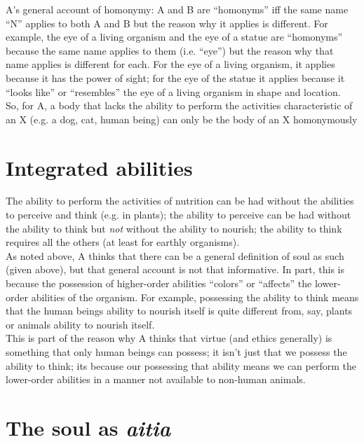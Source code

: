 \documentclass[11pt]{article}
\begin{document}
\noindent A's general account of homonymy: A and B are ``homonyms'' iff the same name ``N'' applies to both A and B but the reason why it applies is different. For example, the eye of a living organism and the eye of a statue are ``homonyms'' because the same name applies to them (i.e. ``eye'') but the reason why that name applies is different for each. For the eye of a living organism, it applies because it has the power of sight; for the eye of the statue it applies because it ``looks like'' or ``resembles'' the eye of a living organism in shape and location.\\

\noindent So, for A, a body that lacks the ability to perform the activities characteristic of an X (e.g. a dog, cat, human being) can only be the body of an X homonymously

\section*{Integrated abilities}

\noindent The ability to perform the activities of nutrition can be had without the abilities to perceive and think (e.g. in plants); the ability to perceive can be had without the ability to think but \emph{not} without the ability to nourish; the ability to think requires all the others (at least for earthly organisms).\\

\noindent As noted above, A thinks that there can be a general definition of soul as such (given above), but that general account is not that informative. In part, this is because the possession of higher-order abilities ``colors'' or ``affects'' the lower-order abilities of the organism. For example, possessing the ability to think means that the human beings ability to nourish itself is quite different from, say, plants or animals ability to nourish itself.\\

\noindent This is part of the reason why A thinks that virtue (and ethics generally) is something that only human beings can possess; it isn't just that we possess the ability to think; its because our possessing that ability means we can perform the lower-order abilities in a manner not available to non-human animals.

\section*{The soul as \emph{aitia}}
\end{document}
